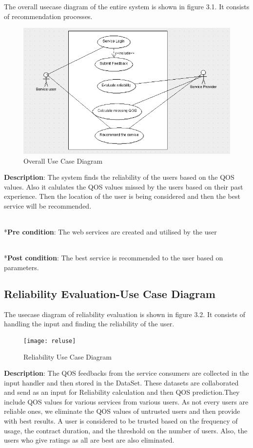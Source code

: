  The overall usecase diagram of the entire system is shown in figure
3.1. It consists of recommendation processes.
\begin{figure}[h!]
  \includegraphics[scale=0.7]{overuse}
  \caption{Overall Use Case Diagram}
  \label{fig:boat1}
\end{figure}

\linebreak
\textbf{Description}: The system finds the reliability of the users based on the QOS values. Also it calulates the QOS values missed by the users based on their past experience. Then the location of the user is being considered and then the best service will be recommended.

\\*\textbf{Pre condition}: The web services are created and utilised by the user

\\*\textbf{Post condition}: The best service is recommended to the user based on parameters.
\newpage
\subsection{Reliability Evaluation-Use Case Diagram }
 The usecase diagram of reliability evaluation is shown in figure 3.2. It consists of handling the input and finding the reliability of the user.
 
\begin{figure}[h!]
\centering
\texttt{[image: reluse]}
\caption{Reliability Use Case Diagram}
\label{fig:universe}
\end{figure}

\textbf{Description}: The QOS feedbacks from the service consumers are collected in the input handler and then stored in the DataSet.
These datasets are collaborated and send as an input for Reliability calculation and then QOS prediction.They include QOS values for various services from various users. As not every users are reliable ones, we eliminate the QOS values of untrusted users and then provide with best results. A user is considered to be trusted based on the frequency of usage, the contract duration, and the threshold on the number of users. Also, the users who give ratings as all are best are also eliminated.

